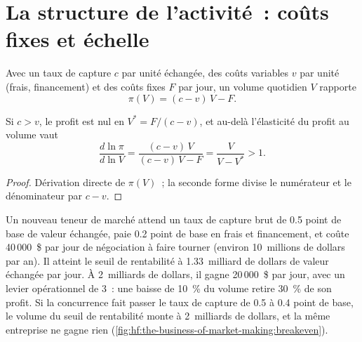 \section{La structure de l'activité~: coûts fixes et échelle}

Avec un taux de capture $c$ par unité échangée, des coûts variables $v$ par unité (frais, financement) et des coûts fixes $F$ par jour, un volume quotidien $V$ rapporte
\[
\pi(V)=(c-v)\,V-F .
\]

\begin{proposition}\label{prop:hf:the-business-of-market-making:leverage}
Si $c>v$, le profit est nul en $V^\ast=F/(c-v)$, et au-delà l'élasticité du profit au volume vaut
\[
\frac{d\ln\pi}{d\ln V}=\frac{(c-v)\,V}{(c-v)\,V-F}=\frac{V}{V-V^\ast}>1 .
\]
\end{proposition}

\begin{proof}
Dérivation directe de $\pi(V)$~; la seconde forme divise le numérateur et le dénominateur par $c-v$.
\end{proof}

\begin{example}\label{ex:hf:the-business-of-market-making:small}
Un nouveau teneur de marché attend un taux de capture brut de 0.5 point de base de valeur échangée, paie 0.2 point de base en frais et financement, et coûte 40\,000~\$ par
jour de négociation à faire tourner (environ 10~millions de dollars par an). Il atteint le seuil de rentabilité à 1.33~milliard de dollars de valeur échangée par jour. À 2~milliards de dollars, il gagne 20\,000~\$ par jour,
avec un levier opérationnel de 3~: une baisse de 10~\% du volume retire 30~\% de son profit. Si la concurrence fait passer le taux de capture de 0.5 à 0.4 point de base, le
volume du seuil de rentabilité monte à 2~milliards de dollars, et la même entreprise ne gagne rien (\cref{fig:hf:the-business-of-market-making:breakeven}).
\end{example}


